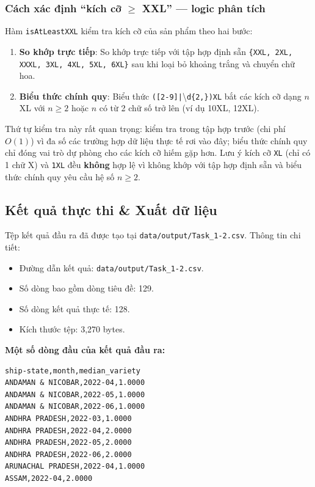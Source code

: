 \subsubsection{Cách xác định ``kích cỡ $\geq$ XXL'' --- logic phân tích}

Hàm \texttt{isAtLeastXXL} kiểm tra kích cỡ của sản phẩm theo hai bước:
\begin{enumerate}
    \item \textbf{So khớp trực tiếp}: So khớp trực tiếp với tập hợp định sẵn \texttt{\{XXL, 2XL, XXXL, 3XL, 4XL, 5XL, 6XL\}} sau khi loại bỏ khoảng trắng và chuyển chữ hoa.
    \item \textbf{Biểu thức chính quy}: Biểu thức \texttt{([2-9]|}\textbackslash\texttt{d\{2,\})XL} bắt các kích cỡ dạng $n$XL với $n \geq 2$ hoặc $n$ có từ 2 chữ số trở lên (ví dụ 10XL, 12XL).
\end{enumerate}

Thứ tự kiểm tra này rất quan trọng: kiểm tra trong tập hợp trước (chi phí $O(1)$) vì đa số các trường hợp dữ liệu thực tế rơi vào đây; biểu thức chính quy chỉ đóng vai trò dự phòng cho các kích cỡ hiếm gặp hơn. Lưu ý kích cỡ \texttt{XL} (chỉ có 1 chữ X) và \texttt{1XL} đều \textbf{không} hợp lệ vì không khớp với tập hợp định sẵn và biểu thức chính quy yêu cầu hệ số $n \geq 2$.

\subsection{Kết quả thực thi \& Xuất dữ liệu}
Tệp kết quả đầu ra đã được tạo tại \texttt{data/output/Task\_1-2.csv}. Thông tin chi tiết:

\begin{itemize}
    \item Đường dẫn kết quả: \texttt{data/output/Task\_1-2.csv}.
    \item Số dòng bao gồm dòng tiêu đề: 129.
    \item Số dòng kết quả thực tế: 128.
    \item Kích thước tệp: 3,270 bytes.
\end{itemize}

\textbf{Một số dòng đầu của kết quả đầu ra:}
\begin{lstlisting}[language={}]
ship-state,month,median_variety
ANDAMAN & NICOBAR,2022-04,1.0000
ANDAMAN & NICOBAR,2022-05,1.0000
ANDAMAN & NICOBAR,2022-06,1.0000
ANDHRA PRADESH,2022-03,1.0000
ANDHRA PRADESH,2022-04,2.0000
ANDHRA PRADESH,2022-05,2.0000
ANDHRA PRADESH,2022-06,2.0000
ARUNACHAL PRADESH,2022-04,1.0000
ASSAM,2022-04,2.0000
\end{lstlisting}

